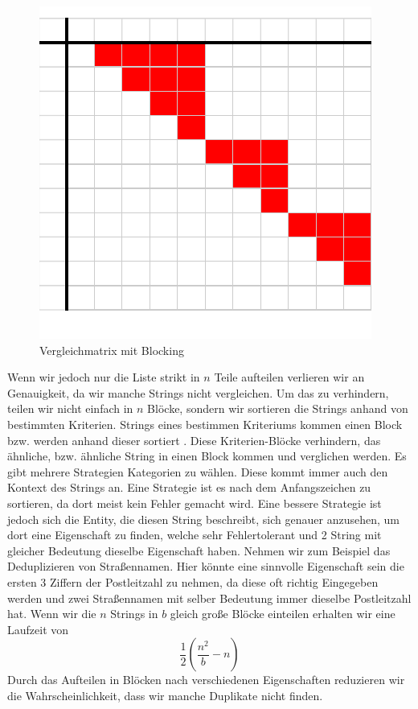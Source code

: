 \documentclass[sigconf]{acmart}
\begin{document}
\begin{figure}[htbp]
  \centering
  \includegraphics{table2.pdf}
  \caption{Vergleichmatrix mit Blocking}
  \label{abb:matrixblock}
\end{figure}

Wenn wir jedoch nur die Liste strikt in $n$
Teile aufteilen verlieren wir an Genauigkeit, da wir
manche Strings nicht vergleichen.
Um das zu verhindern, teilen wir nicht einfach in $n$
Blöcke, sondern wir sortieren die Strings anhand von
bestimmten Kriterien. Strings eines bestimmen Kriteriums kommen
einen Block bzw. werden anhand dieser sortiert \cite[Vlg. S. 11]{elmagarmid1}.
Diese Kriterien-Blöcke verhindern, das
ähnliche, bzw. ähnliche String in einen Block kommen
und verglichen werden.
Es gibt mehrere Strategien Kategorien zu wählen. Diese
kommt immer auch den Kontext des Strings an.
Eine Strategie ist es nach dem Anfangszeichen zu
sortieren, da dort meist kein Fehler gemacht wird.
Eine bessere Strategie ist jedoch sich die Entity,
die diesen String beschreibt, sich genauer anzusehen,
um dort eine Eigenschaft zu finden, welche sehr
Fehlertolerant und 2 String mit gleicher Bedeutung
dieselbe Eigenschaft haben.
Nehmen wir zum Beispiel das Deduplizieren von
Straßennamen. Hier könnte eine sinnvolle
Eigenschaft sein die ersten 3 Ziffern der
Postleitzahl zu nehmen, da diese oft richtig
Eingegeben werden und zwei Straßennamen mit selber
Bedeutung immer dieselbe Postleitzahl hat.
Wenn wir die $n$ Strings in $b$ gleich große Blöcke
einteilen erhalten wir eine Laufzeit von
$$\frac{1}{2} (\frac{n^2}{b}-n)$$
Durch das Aufteilen in Blöcken nach verschiedenen
Eigenschaften reduzieren wir die Wahrscheinlichkeit,
dass wir manche Duplikate nicht finden.
\end{document}
